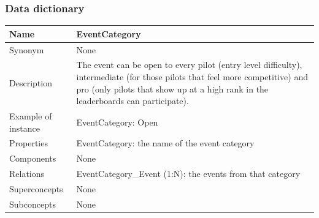 \documentclass{beamer}
\begin{document}
\begin{frame}
    \frametitle{Data dictionary}
    \begin{table}
    \tiny
    \begin{tabular}{|p{2cm}|p{6cm}|}
    \hline
    Name & \textbf{EventCategory} \\
    \hline
    Synonym & None \\
    \hline
    Description & The event can be open to every pilot (entry level difficulty),
    intermediate (for those pilots that feel more competitive) and 
    pro (only pilots that show up at a high rank in the leaderboards can participate). \\
    \hline
    Example of instance &
    EventCategory: Open \\
    \hline
    Properties &
    EventCategory: the name of the event category \\
    \hline
    Components & None \\
    \hline
    Relations &
    EventCategory\_Event (1:N): the events from that category \\
    \hline
    Superconcepts & None \\
    \hline
    Subconcepts & None \\
    \hline
    \end{tabular}
    \end{table}
\end{frame}


























\end{document}
